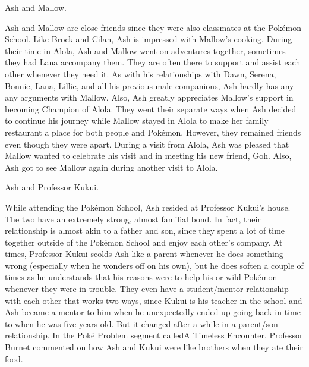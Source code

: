 \documentclass[a4paper,12pt]{article}
\begin{document}
Ash and Mallow.\\ \par \vspace{0.5cm}

Ash and Mallow are close friends since they were also classmates at the Pokémon School. Like Brock and Cilan, Ash is impressed with Mallow's cooking. During their time in Alola, Ash and Mallow went on adventures together, sometimes they had Lana accompany them. They are often there to support and assist each other whenever they need it. As with his relationships with Dawn, Serena, Bonnie, Lana, Lillie, and all his previous male companions, Ash hardly has any any arguments with Mallow. Also, Ash greatly appreciates Mallow's support in becoming Champion of Alola. They went their separate ways when Ash decided to continue his journey while Mallow stayed in Alola to make her family restaurant a place for both people and Pokémon. However, they remained friends even though they were apart. During a visit from Alola, Ash was pleased that Mallow wanted to celebrate his visit and in meeting his new friend, Goh. Also, Ash got to see Mallow again during another visit to Alola.\\ \par \vspace{0.5cm}

Ash and Professor Kukui.\\ \par \vspace{0.5cm}

While attending the Pokémon School, Ash resided at Professor Kukui's house. The two have an extremely strong, almost familial bond. In fact, their relationship is almost akin to a father and son, since they spent a lot of time together outside of the Pokémon School and enjoy each other's company. At times, Professor Kukui scolds Ash like a parent whenever he does something wrong (especially when he wonders off on his own), but he does soften a couple of times as he understands that his reasons were to help his or wild Pokémon whenever they were in trouble. They even have a student/mentor relationship with each other that works two ways, since Kukui is his teacher in the school and Ash became a mentor to him when he unexpectedly ended up going back in time to when he was five years old. But it changed after a while in a parent/son relationship. In the Poké Problem segment calledA Timeless Encounter, Professor Burnet commented on how Ash and Kukui were like brothers when they ate their food.\\ \par \vspace{0.5cm}
\end{document}
